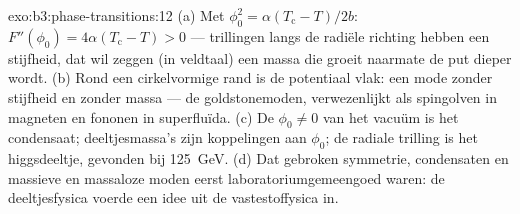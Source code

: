 \begin{solution}{exo:b3:phase-transitions:12}
(a) Met $\phi_0^2 = \alpha(T_{\text{c}} - T)/2b$: $F''(\phi_0) =
4\alpha(T_{\text{c}} - T) > 0$ --- trillingen langs de radiële
richting hebben een stijfheid, dat wil zeggen (in veldtaal) een massa die
groeit naarmate de put dieper wordt. (b) Rond een cirkelvormige rand is de
potentiaal vlak: een mode zonder stijfheid en zonder massa --- de
goldstonemoden, verwezenlijkt als spingolven in magneten en fononen in
superfluïda. (c) De $\phi_0 \neq 0$ van het vacuüm is het condensaat;
deeltjesmassa's zijn koppelingen aan $\phi_0$; de radiale trilling
is het higgsdeeltje, gevonden bij \qty{125}{GeV}. (d) Dat gebroken
symmetrie, condensaten en massieve en massaloze moden eerst
laboratoriumgemeengoed waren: de deeltjesfysica voerde een idee uit de vastestoffysica in.
\end{solution}

